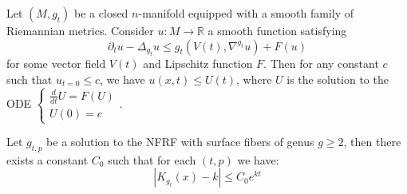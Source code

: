 \documentclass[10pt,a4paper]{amsart}
\begin{document}
\begin{prop}\label{maxprinc}
    Let $(M, g_t)$ be a closed $n$-manifold equipped with a smooth family of Riemannian metrics. Consider $u:M \to \mathbb{R}$ a smooth function satisfying 
    $$\partial_tu - \Delta_{g_t}u \leq g_t(V(t), \nabla^{g_t}u)+F(u)$$
    for some vector field $V(t)$ and Lipschitz function $F$. Then for any constant $c$ such that $u_{t=0} \leq c$, we have $u(x,t)\leq U(t)$, where $U$ is the solution to the ODE $\begin{cases}
        \frac{d}{dt}U=F(U)\\ U(0)=c
    \end{cases}$.
\end{prop}

\begin{lem}
    Let $g_{t,p}$ be a solution to the NFRF with surface fibers of genus $g\geq 2$, then there exists a constant $C_0$ such that for each $(t,p)$ we have\thinspace:
    $$|K_{g_t}(x)-k| \leq C_0 e^{kt}$$ 
\end{lem}
\end{document}
